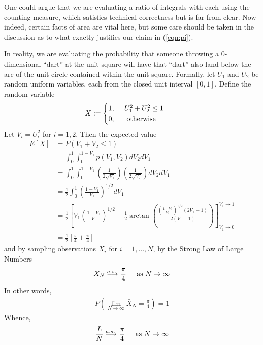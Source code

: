 One could argue that we are evaluating a ratio of integrals with each using
the counting measure, which satisfies technical correctness but is far from
clear. Now indeed, certain facts of area are vital here, but some care should
be taken in the discussion as to what exactly justifies our claim in
(\ref{eqn:pi}).

In reality, we are evaluating the probability that someone throwing a
0-dimensional ``dart'' at the unit square will have that ``dart'' also
land below the arc of the unit circle contained within the unit square.
Formally, let $U_1$ and $U_2$ be random uniform variables, each from the
closed unit interval $[0, 1]$.  Define the random variable
\begin{align*}
X &:= 
\begin{cases} 
1\text{, } \hspace{.4cm} U_1^2 + U_2^2 \leq 1\\ 
0\text{, \hspace{.4cm} otherwise}
\end{cases}
\end{align*}
Let $V_i = U_i^2$ for $i=1, 2$. Then the expected value
\begin{align*}
E[X] &= P( V_1 + V_2 \leq 1 )\\
     &= \int_0^1 \int_0^{1-V_1} p(V_1, V_2)dV_2 dV_1\\
     &= \int_0^1 \int_0^{1-V_1} \left( \frac{1}{2\sqrt{V_1}} \right)
        \left( \frac{1}{2\sqrt{V_2}} \right)dV_2 dV_1\\
     &= \frac{1}{2}\int_0^1 \left(\frac{1-V_1}{V_1}\right)^{1/2}dV_1\\
     &= \frac{1}{2} \left[ 
	V_1\left(\frac{1-V_1}{V_1}\right)^{1/2} 
	 - \frac{1}{2} \arctan\left(\frac{\left(\frac{1-V_1}{V_1}\right)^{1/2}
        (2V_1-1)}{2(V_1-1)}\right) 
	\right]_{V_1\rightarrow 0}^{V_1\rightarrow 1}\\
     &= \frac{1}{2}\left[ \frac{\pi}{4} +\frac{\pi}{4}  \right]
\end{align*}
and by sampling observations $X_i$ for $i=1,\dots,N$, by the Strong Law of
Large Numbers~
\begin{equation}
\bar{X}_N \longrightarrow^{\hspace{-.55cm} a.s.} \hspace{.1cm} \frac{\pi}{4}
\hspace{.4cm} \text{ as } N\rightarrow \infty
\label{eqn:as_convergence}
\end{equation}
In other words,
\begin{align*}
P\left(\lim_{N\rightarrow\infty} \bar{X}_N = \frac{\pi}{4}\right) = 1
\end{align*}
Whence,
\begin{align*}
\frac{L}{N}  \longrightarrow^{\hspace{-.55cm} a.s.} \hspace{.1cm} \frac{\pi}{4} \hspace{.4cm}
\text{ as } N\rightarrow \infty
\end{align*}

